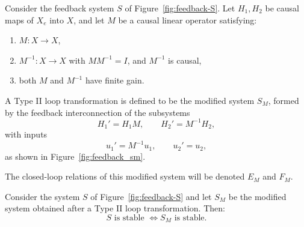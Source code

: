 \begin{definition}
Consider the feedback system $S$ of Figure~\ref{fig:feedback-S}.  
Let $H_1, H_2$ be causal maps of $X_e$ into $X$, and let $M$ be a causal linear operator satisfying:  

\begin{enumerate}
    \item $M: X \to X$,  
    \item $M^{-1}: X \to X$ with $MM^{-1}=I$, and $M^{-1}$ is causal,  
    \item both $M$ and $M^{-1}$ have finite gain.  
\end{enumerate}

A Type II loop transformation is defined to be the modified system $S_M$, formed by the feedback interconnection of the subsystems
\[
H_1' = H_1 M, \qquad H_2' = M^{-1} H_2,
\]
with inputs
\[
u_1' = M^{-1}u_1, \qquad u_2' = u_2,
\]
as shown in Figure~\ref{fig:feedback_sm}.  

The closed-loop relations of this modified system will be denoted $E_M$ and $F_M$.
\end{definition}

\begin{theorem}
Consider the system $S$ of Figure~\ref{fig:feedback-S} and let $S_M$ be the modified system obtained after a Type II loop transformation. Then:
\[
S \text{ is stable } \iff S_M \text{ is stable.}
\]
\end{theorem}
